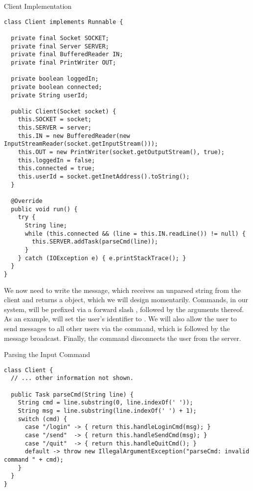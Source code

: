\begin{cl}{Client Implementation}
\begin{lstlisting}[language=MyJava]
class Client implements Runnable {

  private final Socket SOCKET;
  private final Server SERVER;
  private final BufferedReader IN;
  private final PrintWriter OUT;

  private boolean loggedIn;
  private boolean connected;
  private String userId;

  public Client(Socket socket) {
    this.SOCKET = socket;
    this.SERVER = server;
    this.IN = new BufferedReader(new InputStreamReader(socket.getInputStream()));
    this.OUT = new PrintWriter(socket.getOutputStream(), true);
    this.loggedIn = false;
    this.connected = true;
    this.userId = socket.getInetAddress().toString();
  }

  @Override
  public void run() {
    try {
      String line;
      while (this.connected && (line = this.IN.readLine()) != null) { 
        this.SERVER.addTask(parseCmd(line)); 
      }
    } catch (IOException e) { e.printStackTrace(); }
  }
}
\end{lstlisting}
\end{cl}

We now need to write the  message, which receives an unparsed string from the client and returns a  object, which we will design momentarily. Commands, in our system, will be prefixed via a forward slash \ttt{/}, followed by the arguments thereof. As an example,  will set the user's identifier to . We will also allow the user to send messages to all other users via the  command, which is followed by the message broadcast. Finally, the  command disconnects the user from the server.

\begin{cl}{Parsing the Input Command}
\begin{lstlisting}[language=MyJava]
class Client {
  // ... other information not shown.

  public Task parseCmd(String line) {
    String cmd = line.substring(0, line.indexOf(' '));
    String msg = line.substring(line.indexOf(' ') + 1);
    switch (cmd) {
      case "/login" -> { return this.handleLoginCmd(msg); }
      case "/send"  -> { return this.handleSendCmd(msg); }
      case "/quit"  -> { return this.handleQuitCmd(); }
      default -> throw new IllegalArgumentException("parseCmd: invalid command " + cmd);
    }
  }
}
\end{lstlisting}
\end{cl}

